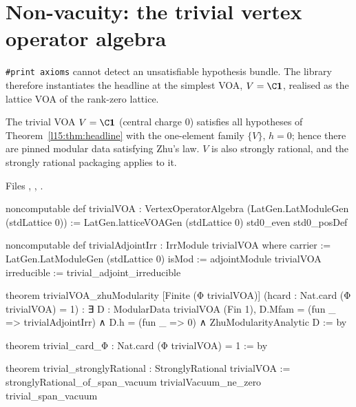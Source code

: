 \section{Non-vacuity: the trivial vertex operator algebra}\label{l15:sec:nonvac}

\texttt{\#print axioms} cannot detect an unsatisfiable hypothesis bundle. The library therefore instantiates the headline at
the simplest VOA, $V=\C\lfifteenvac$, realised as the lattice VOA of the rank-zero lattice.

\begin{theorem}\label{l15:thm:trivial}
The trivial VOA $V=\C\lfifteenvac$ (central charge $0$) satisfies all hypotheses of Theorem~\ref{l15:thm:headline} with the
one-element family $\{V\}$, $h=0$; hence there are pinned modular data satisfying Zhu's law. $V$ is also strongly rational,
and the strongly rational packaging applies to it.
\end{theorem}
\noindent Files ,
, .
\begin{leancode}
noncomputable def trivialVOA : VertexOperatorAlgebra (LatGen.LatModuleGen (stdLattice 0)) :=
  LatGen.latticeVOAGen (stdLattice 0) std0_even std0_posDef

noncomputable def trivialAdjointIrr : IrrModule trivialVOA where
  carrier := LatGen.LatModuleGen (stdLattice 0)
  isMod := adjointModule trivialVOA
  irreducible := trivial_adjoint_irreducible

theorem trivialVOA_zhuModularity [Finite (Φ trivialVOA)]
    (hcard : Nat.card (Φ trivialVOA) = 1) :
    ∃ D : ModularData trivialVOA (Fin 1),
      D.Mfam = (fun _ => trivialAdjointIrr) ∧ D.h = (fun _ => 0) ∧
        ZhuModularityAnalytic D := by

theorem trivial_card_Φ : Nat.card (Φ trivialVOA) = 1 := by

theorem trivial_stronglyRational : StronglyRational trivialVOA :=
  stronglyRational_of_span_vacuum trivialVacuum_ne_zero trivial_span_vacuum
\end{leancode}


